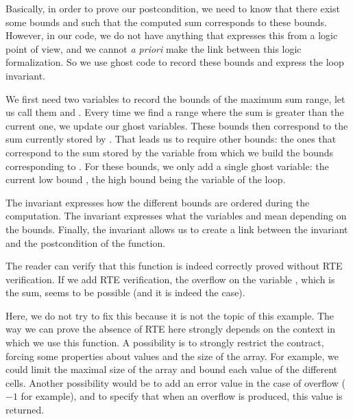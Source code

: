 Basically, in order to prove our postcondition, we need to know that there
exist some bounds
 and  such that the computed sum corresponds to
these bounds. However, in our code, we do not have anything that expresses
this from a logic point of view, and we cannot \emph{a priori} make the
link between this logic formalization. So we use ghost code to
record these bounds and express the loop invariant.


We first need two variables to record the bounds
of the maximum sum range, let us call them  and
. Every time we find a range where the sum is greater
than the current one, we update our ghost variables. These bounds
then correspond to the sum currently stored by . That
leads us to require other bounds: the ones that correspond to the sum
stored by the variable  from which we build the bounds
corresponding to . For these bounds, we only add a
single ghost variable: the current low bound , the high
bound being the variable  of the loop.






The invariant  expresses how the different bounds are
ordered during the computation. The invariant  expresses
what the variables  and  mean depending on the
bounds. Finally, the invariant  allows us to create a link
between the invariant and the postcondition of the function.



The reader can verify that this function is indeed correctly proved
without RTE verification. If we add RTE verification, the overflow on
the variable , which is the sum, seems to be possible (and it
is indeed the case).



Here, we do not try to fix this because it is not the topic of this
example. The way we can prove the absence of RTE here strongly depends
on the context in which we use this function. A possibility is to strongly
restrict the contract, forcing some properties about values and the size
of the array. For example, we could limit the maximal size of the array
and bound each value of the different cells. Another possibility would be to
add an error value in the case of overflow
(\(-1\) for example), and to specify that when an overflow is produced,
this value is returned.



